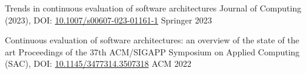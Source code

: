 
\begin{cvhonors}

  \cvhonor
    {Trends in continuous evaluation of software architectures} %
    {Journal of Computing (2023), DOI: \href{https://doi.org/10.1007/s00607-023-01161-1}{10.1007/s00607-023-01161-1}} %
    {Springer} %
    {2023} %

  \cvhonor
    {Continuous evaluation of software architectures: an overview of the state of the art} %
    {Proceedings of the 37th ACM/SIGAPP Symposium on Applied Computing (SAC), DOI: \href{https://doi.org/10.1145/3477314.3507318}{10.1145/3477314.3507318}} %
    {ACM} %
    {2022} %

\end{cvhonors}
